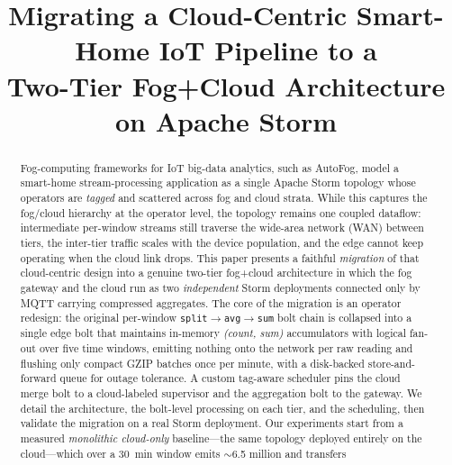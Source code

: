 \documentclass[conference]{IEEEtran}
\newcommand{\code}[1]{\texttt{#1}}
\begin{document}
\title{Migrating a Cloud-Centric Smart-Home IoT Pipeline to a\\
Two-Tier Fog+Cloud Architecture on Apache Storm}

\author{
}

\maketitle

\begin{abstract}
Fog-computing frameworks for IoT big-data analytics, such as AutoFog, model a
smart-home stream-processing application as a single Apache Storm topology whose
operators are \emph{tagged} and scattered across fog and cloud strata. While this
captures the fog/cloud hierarchy at the operator level, the topology remains one
coupled dataflow: intermediate per-window streams still traverse the wide-area
network (WAN) between tiers, the inter-tier traffic scales with the device
population, and the edge cannot keep operating when the cloud link drops. This
paper presents a faithful \emph{migration} of that cloud-centric design into a
genuine two-tier fog+cloud architecture in which the fog gateway and the cloud
run as two \emph{independent} Storm deployments connected only by MQTT carrying
compressed aggregates. The core of the migration is an operator redesign: the
original per-window \code{split}$\to$\code{avg}$\to$\code{sum} bolt chain is
collapsed into a single edge bolt that maintains in-memory \emph{(count, sum)}
accumulators with logical fan-out over five time windows, emitting nothing onto
the network per raw reading and flushing only compact GZIP batches once per
minute, with a disk-backed store-and-forward queue for outage tolerance. A custom
tag-aware scheduler pins the cloud merge bolt to a cloud-labeled supervisor and
the aggregation bolt to the gateway. We detail the architecture, the bolt-level
processing on each tier, and the scheduling, then validate the migration on a
real Storm deployment. Our experiments start from a measured \emph{monolithic
cloud-only} baseline---the same topology deployed entirely on the cloud---which
over a \SI{30}{\minute} window emits $\sim$\SI{6.5}{} million and transfers

\end{abstract}
\end{document}

